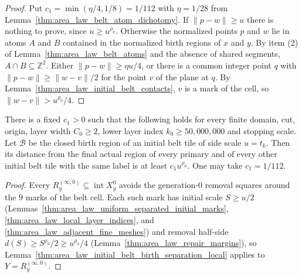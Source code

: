 \begin{proof}
    \leanok
    Put $c_1=\min(\eta/4,1/8)=1/112$ with $\eta=1/28$ from
    Lemma~\ref{thm:area_law_belt_atom_dichotomy}. If $\|p-w\|\ge u$ there is
    nothing to prove, since $u\ge u^{\rho_0}$. Otherwise the normalized points
    $p$ and $w$ lie in atoms $A$ and $B$ contained in the normalized birth
    regions of $x$ and $y$. By item (2) of
    Lemma~\ref{thm:area_law_belt_atoms} and the absence of shared segments,
    $A\cap B\subseteq\mathbb Z^2$. Either $\|p-w\|\ge\eta u/4$, or there is a
    common integer point $q$ with $\|p-w\|\ge\|w-v\|/2$ for the point $v$ of
    the plane at $q$. By Lemma~\ref{thm:area_law_initial_belt_contacts}, $v$
    is a mark of the cell, so $\|w-v\|>u^{\rho_0}/4$.
\end{proof}

\begin{lemma}
    \label{thm:area_law_initial_belt_birth_separation}
    \leanok
    There is a fixed $c_1>0$ such that the following holds for every finite
    domain, cut, origin, layer width $C_0\ge2$, lower layer index
    $k_0\ge50{,}000{,}000$ and stopping scale.
    Let $\mathcal B$ be the closed birth region of an initial belt tile of
    side scale $u=t_k$. Then its distance from the final actual region of
    every primary and of every other initial belt tile with the same label is
    at least $c_1u^{\rho_0}$. One may take $c_1=1/112$.
\end{lemma}

\begin{proof}
    \leanok
    Every $R_y^{(\infty,0)}\subseteq\operatorname{int}X_y^0$ avoids the generation-$0$ removal squares
    around the $9$ marks of the belt cell. Each such mark has initial scale $S\ge u/2$
    (Lemmas~\ref{thm:area_law_uniform_separated_initial_marks}, \ref{thm:area_law_local_layer_indices},
    and \ref{thm:area_law_adjacent_fine_meshes}) and removal half-side $d(S)\ge S^{\rho_0}/2\ge u^{\rho_0}/4$
    (Lemma~\ref{thm:area_law_repair_margins}), so Lemma~\ref{thm:area_law_initial_belt_birth_separation_local}
    applies to $Y=R_y^{(\infty,0)}$.
\end{proof}

